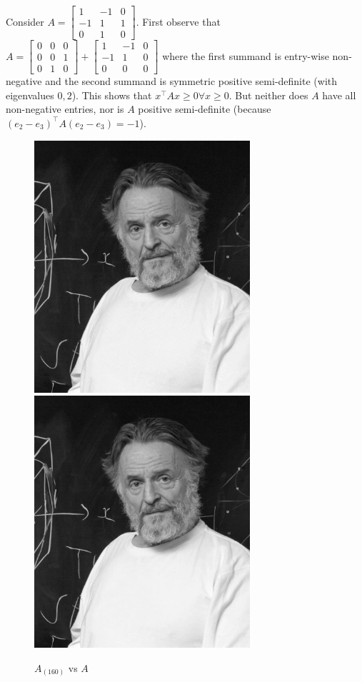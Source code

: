 \begin{enumerate}[leftmargin=*]
Consider $A = \begin{bmatrix}1&-1&0\\-1&1&1\\0&1&0\end{bmatrix}$. First observe that $A = \begin{bmatrix}0&0&0\\0&0&1\\0&1&0\end{bmatrix} + \begin{bmatrix}1&-1&0\\-1&1&0\\0&0&0\end{bmatrix}$ where the first summand is entry-wise non-negative and the second summand is symmetric positive semi-definite (with eigenvalues $0,2$). This shows that $x^\top Ax\geq 0\forall x\geq 0$. But neither does $A$ have all non-negative entries, nor is $A$ positive semi-definite (because $(e_2-e_3)^\top A(e_2-e_3) = -1$).
\end{enumerate}

{}
\begin{figure}[t]
\includegraphics[width=8cm]{A160.jpg}
\includegraphics[width=8cm]{original.jpg}
\caption{$A_{(160)}$ vs $A$}
\label{fig:figr}
\centering
\end{figure}


